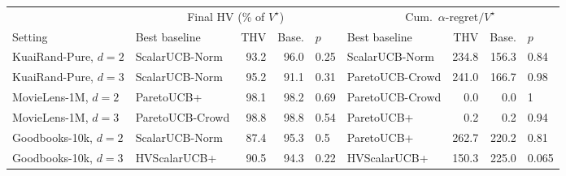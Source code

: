 \begin{tabular}{l lrrl lrrl}
\toprule
 & \multicolumn{4}{c}{Final HV (\% of $V^\star$)} & \multicolumn{4}{c}{Cum.\ $\alpha$-regret$/V^\star$}\\
\cmidrule(lr){2-5}\cmidrule(lr){6-9}
Setting & Best baseline & THV & Base. & $p$ & Best baseline & THV & Base. & $p$\\
\midrule
KuaiRand-Pure, $d=2$ & ScalarUCB-Norm & 93.2 & 96.0 & 0.25 & ScalarUCB-Norm & 234.8 & 156.3 & 0.84\\
KuaiRand-Pure, $d=3$ & ScalarUCB-Norm & 95.2 & 91.1 & 0.31 & ParetoUCB-Crowd & 241.0 & 166.7 & 0.98\\
MovieLens-1M, $d=2$ & ParetoUCB+ & 98.1 & 98.2 & 0.69 & ParetoUCB-Crowd & 0.0 & 0.0 & 1\\
MovieLens-1M, $d=3$ & ParetoUCB-Crowd & 98.8 & 98.8 & 0.54 & ParetoUCB+ & 0.2 & 0.2 & 0.94\\
Goodbooks-10k, $d=2$ & ScalarUCB-Norm & 87.4 & 95.3 & 0.5 & ParetoUCB+ & 262.7 & 220.2 & 0.81\\
Goodbooks-10k, $d=3$ & HVScalarUCB+ & 90.5 & 94.3 & 0.22 & HVScalarUCB+ & 150.3 & 225.0 & 0.065\\
\bottomrule
\end{tabular}
